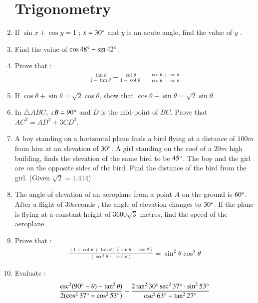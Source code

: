 \documentclass[2pt,-letter paper]{article}
\begin{document}
\begin{enumerate}
\section{Trigonometry}

\item If $\sin{x} + \cos{y}= 1$ ; $x=30\degree$  and  $y$ is an acute angle, find the value of $y$ .

\item Find the value of $\cos {48\degree} - \sin {42\degree}$.


\item Prove that :
\begin{align*}
   {\frac{\tan\theta}{1-\tan\theta}} - {\frac{\cot\theta}{1-\cot\theta}}={\frac{\cos\theta+ \sin\theta}{\cos\theta-\sin\theta}}
\end{align*} 

\item If ${\cos\theta + \sin\theta} = {\sqrt 2}{\cos\theta}$, show that ${\cos\theta - \sin\theta} = {\sqrt 2}{\sin\theta}$.

\item In ${\triangle ABC}$, ${\angle B} = {90\degree}$ and $D$ is the mid-point of $BC$. Prove that ${AC}^2 = {AD}^2 + 3{CD}^2$.

\item A boy standing on a horizontal plane finds a bird flying at a distance of $100 m$ from him at an elevation of $30\degree$. A girl standing on the roof of a $20 m$ high building, finds the elevation of the same bird to be $45\degree$. The boy and the girl are on the opposite sides of the bird. Find the distance of the bird from the girl. (Given ${\sqrt 2}= 1.414$)

\item The angle of elevation of an aeroplane from a point $A$ on the ground is $60\degree$. After a flight of $30 $seconds , the angle of elevation changes to $30\degree$. If the plane is flying at a constant height of $3600\sqrt 3 $ metres, find the speed of the aeroplane.

\item Prove that :
\begin{align*}
    {\frac{(1+\cot\theta+\tan\theta)(\sin\theta-\cos\theta)}{(\sec^3\theta-\csc^3\theta)}} = \sin^2\theta \cos^2\theta
\end{align*}

\item Evaluate :
\begin{align*}
    {\frac{\csc^2(90\degree - \theta)-\tan^2\theta)}{2(\cos^2 37\degree + \cos^2 53\degree)}} - {\frac{2\tan^2 30\degree \sec^2 37\degree \cdot \sin^2 53\degree}{\csc^2 63\degree - \tan^2 27\degree}} 
\end{align*}


\end{enumerate}
\end{document}
